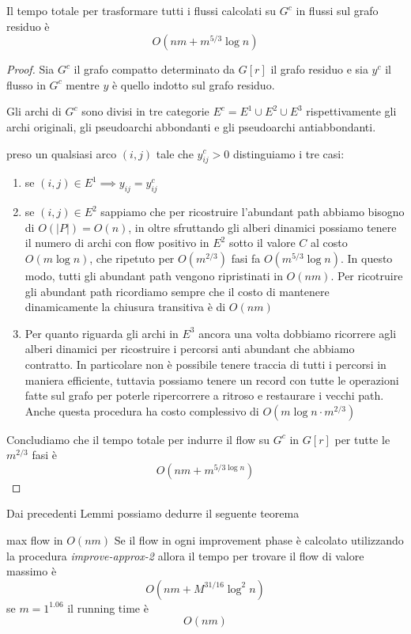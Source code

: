\begin{lemma}{}{}
    Il tempo totale per trasformare tutti i flussi calcolati su $G^c$ in flussi sul grafo residuo è 
    \[O(nm+ m^{5/3}\log n)\]

\end{lemma}
\begin{proof}
    Sia $G^c$ il grafo compatto determinato da $G[r]$ il grafo residuo e sia $y^c$ il flusso in  $G^c$ mentre $y$ è quello indotto sul grafo residuo.

    Gli archi di $G^c$ sono divisi in tre categorie $E^c = E^1\cup E^2\cup E^3$ rispettivamente gli archi originali, gli pseudoarchi abbondanti e gli pseudoarchi antiabbondanti.

    preso un qualsiasi arco $(i,j)$ tale che $y^c_{ij}> 0$ distinguiamo i tre casi:
    \begin{enumerate}
        \item se $(i,j) \in E^1 \implies y_{ij} = y^c_{ij}$
        \item se $(i,j) \in E^2$ sappiamo che per ricostruire l'abundant path abbiamo bisogno di $O(|P|) = O(n)$, in oltre sfruttando gli alberi dinamici possiamo tenere il numero di archi con flow positivo in $E^2$ sotto il valore $C$ al costo $O(m\log n)$, che ripetuto per $O(m^{2/3})$ fasi fa $O(m^{5/3}\log n)$. In questo modo, tutti gli abundant path vengono ripristinati in $O(nm)$.
        Per ricotruire gli abundant path ricordiamo sempre che il costo di mantenere dinamicamente la chiusura transitiva è di $O(nm)$
        \item Per quanto riguarda gli archi in $E^3$ ancora una volta dobbiamo ricorrere agli alberi dinamici per ricostruire i percorsi anti abundant che abbiamo contratto. In particolare non è possibile tenere traccia di tutti i percorsi in maniera efficiente, tuttavia possiamo tenere un record con tutte le operazioni fatte sul grafo per poterle ripercorrere a ritroso e restaurare i vecchi path. Anche questa procedura ha costo complessivo di $O(m\log n\cdot m^{2/3})$ 
    \end{enumerate}
    Concludiamo che il tempo totale per indurre il flow su $G^c$ in $G[r]$ per tutte le $m^{2/3}$ fasi è 
    \[O(nm+m^{5/3\log n})\]\QED
\end{proof}

Dai precedenti Lemmi possiamo dedurre il seguente teorema
\begin{theorem}{max flow in $O(nm)$}{}
    Se il flow in ogni improvement phase è calcolato utilizzando la procedura \textit{improve-approx-2} allora il tempo per trovare il flow di valore massimo è 
    \[O(nm+M^{31/16}\log^2n)\]
    se $m= 1^{1.06}$ il running time è
    \[O(nm)\]
\end{theorem}


\cleardoublepage